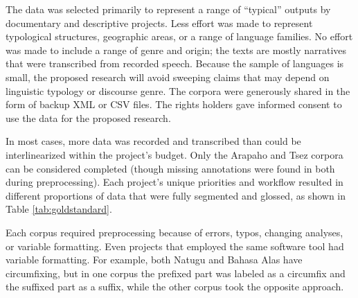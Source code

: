 The data was selected primarily to represent a range of “typical” outputs by documentary and descriptive projects. Less effort was made to represent typological structures, geographic areas, or a range of language families. No effort was made to include a range of genre and origin; the texts are mostly narratives that were transcribed from recorded speech. Because the sample of languages is small, the proposed research will avoid sweeping claims that may depend on linguistic typology or discourse genre. 
The corpora were generously shared in the form of backup XML or CSV files. The rights holders gave informed consent to use the data for the proposed research. 

In most cases, more data was recorded and transcribed than could be interlinearized within the project's budget. Only the Arapaho and Tsez corpora can be considered completed (though missing annotations were found in both during preprocessing). Each project's unique priorities and workflow resulted in different proportions of data that were fully segmented and glossed, as shown in Table \ref{tab:goldstandard}.


Each corpus required preprocessing because of errors, typos, changing analyses, or variable formatting. Even projects that employed the same software tool had variable formatting. For example, both Natugu and Bahasa Alas have circumfixing, but in one corpus the prefixed part was labeled as a circumfix and the suffixed part as a suffix, while the other corpus took the opposite approach. 

